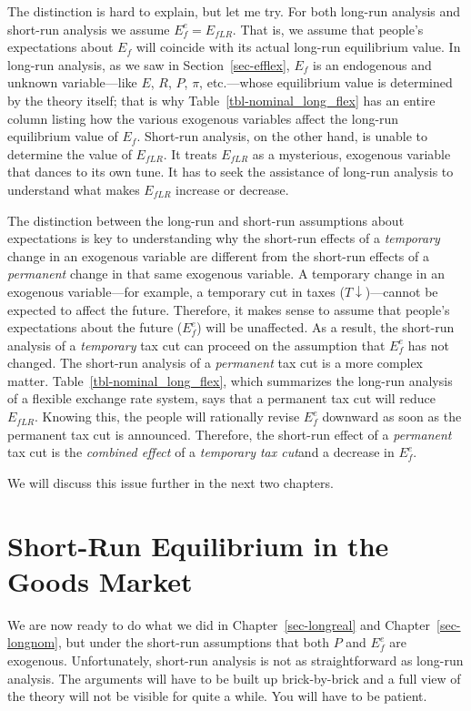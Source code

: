 \documentclass[
  letterpaper,
]{book}
\theoremstyle{plain}
\theoremstyle{remark}
\begin{document}
The distinction is hard to explain, but let me try. For both long-run
analysis and short-run analysis we assume \(E_f^e=E_{fLR}\). That is, we
assume that people's expectations about \(E_f\) will coincide with its
actual long-run equilibrium value. In long-run analysis, as we saw in
Section~\ref{sec-efflex}, \(E_f\) is an endogenous and unknown
variable---like \(E\), \(R\), \(P\), \(\pi\), etc.---whose equilibrium
value is determined by the theory itself; that is why
Table~\ref{tbl-nominal_long_flex} has an entire column listing how the
various exogenous variables affect the long-run equilibrium value of
\(E_f\). Short-run analysis, on the other hand, is unable to determine
the value of \(E_{fLR}\). It treats \(E_{fLR}\) as a mysterious,
exogenous variable that dances to its own tune. It has to seek the
assistance of long-run analysis to understand what makes \(E_{fLR}\)
increase or decrease.

The distinction between the long-run and short-run assumptions about
expectations is key to understanding why the short-run effects of a
\emph{temporary} change in an exogenous variable are different from the
short-run effects of a \emph{permanent} change in that same exogenous
variable. A temporary change in an exogenous variable---for example, a
temporary cut in taxes (\(T\downarrow\))---cannot be expected to affect
the future. Therefore, it makes sense to assume that people's
expectations about the future (\(E_f^e\)) will be unaffected. As a
result, the short-run analysis of a \emph{temporary} tax cut can proceed
on the assumption that \(E_f^e\) has not changed. The short-run analysis
of a \emph{permanent} tax cut is a more complex matter.
Table~\ref{tbl-nominal_long_flex}, which summarizes the long-run
analysis of a flexible exchange rate system, says that a permanent tax
cut will reduce \(E_{fLR}\). Knowing this, the people will rationally
revise \(E_f^e\) downward as soon as the permanent tax cut is announced.
Therefore, the short-run effect of a \emph{permanent} tax cut is the
\emph{combined effect} of a \emph{temporary tax cut}and a decrease in
\(E_f^e\).

We will discuss this issue further in the next two chapters.

\section{Short-Run Equilibrium in the Goods
Market}\label{sec-goodseqm-shortfix}

We are now ready to do what we did in Chapter~\ref{sec-longreal} and
Chapter~\ref{sec-longnom}, but under the short-run assumptions that both
\(P\) and \(E_f^e\) are exogenous. Unfortunately, short-run analysis is
not as straightforward as long-run analysis. The arguments will have to
be built up brick-by-brick and a full view of the theory will not be
visible for quite a while. You will have to be patient.
\end{document}

